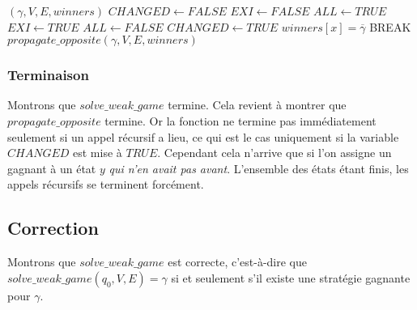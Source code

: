 \documentclass[10pt,a4paper]{article}
\begin{document}
\begin{algorithm}
\caption{$propagate\_opposite$}

\begin{algorithmic}[1]
	\REQUIRE $(\gamma, V, E, winners)$
	\STATE $CHANGED \leftarrow FALSE$
			\STATE $EXI \leftarrow FALSE$
			\STATE $ALL \leftarrow TRUE$
					\STATE $EXI \leftarrow TRUE$
				\ELSE
					\STATE $ALL \leftarrow FALSE$
				\ENDIF
			\ENDFOR
				\STATE $CHANGED \leftarrow TRUE$
				\STATE $winners[x] = \overline{\gamma}$
				\STATE BREAK 
			\ENDIF
		\ENDIF
	\ENDFOR
		\STATE $propagate\_opposite(\gamma, V, E, winners)$
	\ENDIF
	\RETURN
\end{algorithmic}
\end{algorithm}

\subsubsection{Terminaison}
Montrons que $solve\_weak\_game$ termine. Cela revient à montrer que $propagate\_opposite$ termine. Or la fonction ne termine pas immédiatement seulement si un appel récursif a lieu, ce qui est le cas uniquement si la variable $CHANGED$ est mise à $TRUE$. Cependant cela n'arrive que si l'on assigne un gagnant à un état $y$ \emph{qui n'en avait pas avant}. L'ensemble des états étant finis, les appels récursifs se terminent forcément.

\subsection{Correction}
Montrons que $solve\_weak\_game$ est correcte, c'est-à-dire que $solve\_weak\_game(q_0,V,E) = \gamma$ si et seulement s'il existe une stratégie gagnante pour $\gamma$.
\end{document}
